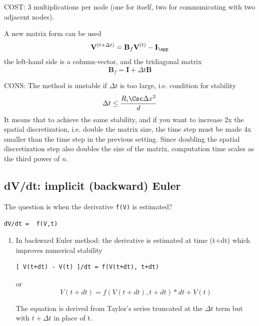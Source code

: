 COST: 3 multiplications per node (one for itself, two for communicating with
two adjacent nodes).

A new matrix form can be used
\begin{equation}
\mathbf{V}^{(t+\Delta t)} = \mathbf{B}_f \mathbf{V}^{(t)} - \mathbf{I_\app}
\end{equation}
the left-hand side is a column-vector, and the tridiagonal matrix
\begin{equation}
\mathbf{B}_f = \mathbf{I} + \Delta t \mathbf{B}
\end{equation}

CONS: The method is unstable if $\Delta t$ is too large, i.e. condition for
stability
\begin{equation}
\Delta t \le \frac{R_i \Csc \Delta x^2}{d}
\end{equation}
It means that to achieve the same stability, and if you want to increase 2x the
spatial discretization, i.e. double the matrix size, the time step must be made
4x smaller than the time step in the previous setting. 
Since doubling the spatial discretization step also doubles the size of the matrix,
computation time scales as the third power of $n$.


\subsection{dV/dt: implicit (backward) Euler}
\label{sec:implicit-method}
\label{sec:backward-Euler}

The question is when the derivative \verb!f(V)! is estimated?
\begin{verbatim}
dV/dt =  f(V,t)
\end{verbatim}
\begin{enumerate}
 \item In backward Euler method: the derivative is estimated at time (t+dt)
 which improves numerical stability
  
\begin{verbatim}
[ V(t+dt) - V(t) ]/dt = f(V(t+dt), t+dt)
\end{verbatim}
or
\begin{equation}
V(t+dt) = f(V(t+dt), t+dt) * dt + V(t)
\end{equation}

The equation is derived from Taylor's series truncated at the $\Delta t$ term
but with $t + \Delta t$ in place of t.

\end{enumerate}

